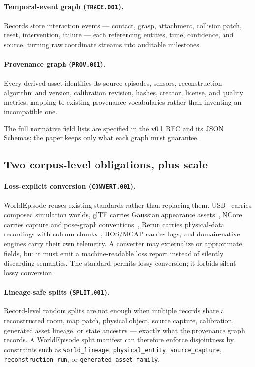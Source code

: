 \paragraph{Temporal-event graph (\texttt{TRACE.001}).}
Records store interaction events --- contact, grasp, attachment, collision patch, reset,
intervention, failure --- each referencing entities, time, confidence, and source, turning raw
coordinate streams into auditable milestones.

\paragraph{Provenance graph (\texttt{PROV.001}).}
Every derived asset identifies its source episodes, sensors, reconstruction algorithm and version,
calibration revision, hashes, creator, license, and quality metrics, mapping to existing provenance
vocabularies rather than inventing an incompatible one.

The full normative field lists are specified in the v0.1 RFC and its JSON Schemas; the paper keeps
only what each graph must guarantee.

\subsection{Two corpus-level obligations, plus scale}

\paragraph{Loss-explicit conversion (\texttt{CONVERT.001}).}
WorldEpisode reuses existing standards rather than replacing them. USD~\citep{usd} carries composed
simulation worlds, glTF carries Gaussian appearance assets~\citep{gltf_gs}, NCore carries capture
and pose-graph conventions~\citep{ncore}, Rerun carries physical-data recordings with column
chunks~\citep{rerun}, ROS/MCAP carries logs, and domain-native engines carry their own telemetry.
A converter may externalize or approximate fields, but it must emit a machine-readable loss report
instead of silently discarding semantics. The standard permits lossy conversion; it forbids silent
lossy conversion.

\paragraph{Lineage-safe splits (\texttt{SPLIT.001}).}
Record-level random splits are not enough when multiple records share a reconstructed room, map
patch, physical object, source capture, calibration, generated asset lineage, or state ancestry ---
exactly what the provenance graph records. A WorldEpisode split manifest can therefore enforce
disjointness by constraints such as \texttt{world\_lineage}, \texttt{physical\_entity},
\texttt{source\_capture}, \texttt{reconstruction\_run}, or \texttt{generated\_asset\_family}.

